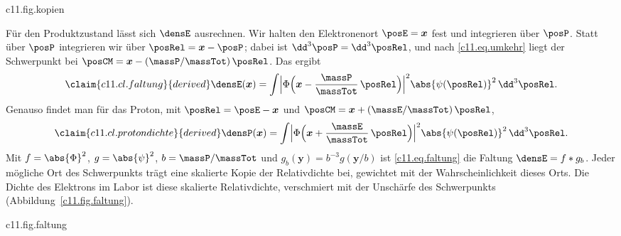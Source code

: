 
\begin{tpcfigure}{c11.fig.kopien}
  \caption{Wie die Dichte des Elektrons im Labor zustande kommt, als Schema; Längen und Strichstärken bedeuten nichts. Jeder mögliche Ort des Schwerpunkts (Kreuze) trägt eine skalierte Kopie der Relativdichte (Ringe), mit $g_b(\boldsymbol{y}) = b^{-3}g(\boldsymbol{y}/b)$, $g = \abs{\psi}^2$ und $b = \massP/\massTot$, und zwar mit dem Gewicht, mit dem dieser Ort im Schwerpunktszustand vorkommt. Die Summe aller Kopien ist $\densE$. Die Rechnung dazu folgt.}
\end{tpcfigure}

Für den Produktzustand lässt sich $\densE$ ausrechnen. Wir halten den Elektronenort
$\posE = \boldsymbol{x}$ fest und integrieren über $\posP$. Statt über $\posP$
integrieren wir über $\posRel = \boldsymbol{x} - \posP$; dabei ist
$\dd^3\posP = \dd^3\posRel$, und nach \eqref{c11.eq.umkehr} liegt der Schwerpunkt bei
$\posCM = \boldsymbol{x} - (\massP/\massTot)\,\posRel$. Das ergibt
\begin{equation}\label{c11.eq.faltung}\claim{c11.cl.faltung}{derived}
  \densE(\boldsymbol{x})
  = \int \Bigl\lvert \Phi\Bigl(\boldsymbol{x} - \frac{\massP}{\massTot}\,\posRel\Bigr)
    \Bigr\rvert^2 \abs{\psi(\posRel)}^2 \,\dd^3\posRel .
\end{equation}
Genauso findet man für das Proton, mit $\posRel = \posE - \boldsymbol{x}$ und
$\posCM = \boldsymbol{x} + (\massE/\massTot)\,\posRel$,
\begin{equation}\label{c11.eq.protondichte}\claim{c11.cl.protondichte}{derived}
  \densP(\boldsymbol{x})
  = \int \Bigl\lvert \Phi\Bigl(\boldsymbol{x} + \frac{\massE}{\massTot}\,\posRel\Bigr)
    \Bigr\rvert^2 \abs{\psi(\posRel)}^2 \,\dd^3\posRel .
\end{equation}
Mit $f = \abs{\Phi}^2$, $g = \abs{\psi}^2$, $b = \massP/\massTot$ und
$g_b(\boldsymbol{y}) = b^{-3}g(\boldsymbol{y}/b)$ ist \eqref{c11.eq.faltung} die
Faltung $\densE = f * g_b$. Jeder mögliche Ort des Schwerpunkts trägt eine skalierte
Kopie der Relativdichte bei, gewichtet mit der Wahrscheinlichkeit dieses Orts. Die
Dichte des Elektrons im Labor ist diese skalierte Relativdichte, verschmiert mit der
Unschärfe des Schwerpunkts (Abbildung~\ref{c11.fig.faltung}).

\begin{tpcfigure}{c11.fig.faltung}
  \caption{Die Faltung \eqref{c11.eq.faltung} entlang einer Geraden durch die Mitte des
    Schwerpunktpakets, für $\Znuc = 1$. Dünn durchgezogen: die Relativdichte
    $\abs{\psinlm{1}{0}{0}}^2$ des Zustands 1s aus Abschnitt~\ref{c11.s5}. Gestrichelt:
    die Dichte $\abs{\Phi}^2$ eines Schwerpunktpakets in Form einer Glockenkurve; ihre
    Breite, $\num[c11.cl.wolke]{0{,}7}{}$ Längeneinheiten, ist für das Bild gewählt.
    Dick: die Dichte $\densE$ des Elektrons im Labor. Sie ist breiter und flacher als
    beide. Am markierten Punkt, eine Längeneinheit von der Mitte, ist
    $\densE\,\aRed^3 = \num[c11.cl.wolke]{0{,}0379}{}$. Längeneinheit ist der Bohrsche
    Radius $\aRed$ mit reduzierter Masse aus Abschnitt~\ref{c11.s4}.}
\end{tpcfigure}

